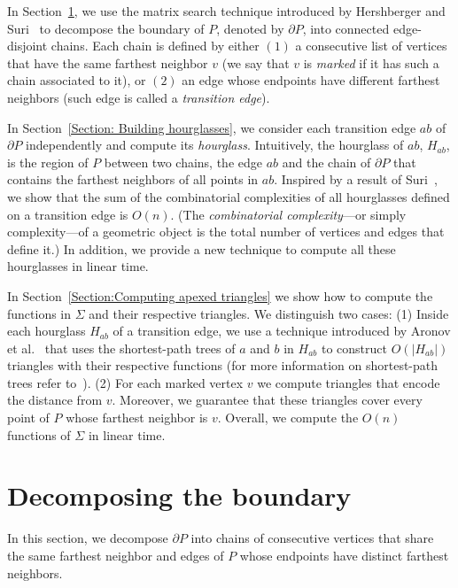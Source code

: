 \documentclass[a4paper,UKenglish]{lipics}
\begin{document}
In Section~\ref{Section:Decomposing the boundary}, we use the matrix search technique introduced by Hershberger and Suri~\cite{hershberger1993matrix} to decompose the boundary of $P$, denoted by $\partial P$, into connected edge-disjoint chains.
Each chain is defined by either $(1)$ a consecutive list of vertices that have the same farthest neighbor $v$ (we say that $v$ is \emph{marked} if it has such a chain associated to it), or $(2)$ an edge whose endpoints have different farthest neighbors (such edge is called a \emph{transition edge}).

In Section~\ref{Section: Building hourglasses}, we consider each transition edge $ab$ of $\partial P$ independently and compute its \emph{hourglass}. Intuitively, the hourglass of $ab$, $H_{ab}$, is the region of $P$ between two chains, the edge $ab$ and the chain of $\partial P$ that contains the farthest neighbors of all points in $ab$.
Inspired by a result of Suri~\cite{suri1989computing}, we show that the sum of the combinatorial complexities of all hourglasses defined on a transition edge is $O(n)$. (The \emph{combinatorial complexity}---or simply complexity---of a geometric object is the total number of vertices and edges that define it.)
In addition, we provide a new technique to compute all these hourglasses in linear time.

In Section~\ref{Section:Computing apexed triangles} we show how to compute the functions in $\Sigma$ and their respective triangles.
We distinguish two cases: (1) Inside each hourglass $H_{ab}$ of a transition edge, we use a technique introduced by Aronov et al.~\cite{aronov1993furthest} that uses the shortest-path trees of $a$ and $b$ in $H_{ab}$ to construct $O(|H_{ab}|)$ triangles with their respective functions (for more information on shortest-path trees refer to~\cite{guibasShortestPathTree}). 
(2) For each marked vertex $v$ we compute triangles that encode the distance from $v$. Moreover, we guarantee that these triangles cover every point of $P$ whose farthest neighbor is $v$. 
Overall, we compute the $O(n)$ functions of $\Sigma$ in linear time.

\section{Decomposing the boundary}\label{Section:Decomposing the boundary}
In this section, we decompose $\partial P$ into chains of consecutive vertices that share the same farthest neighbor and edges of $P$ whose endpoints have distinct farthest neighbors.
\end{document}
